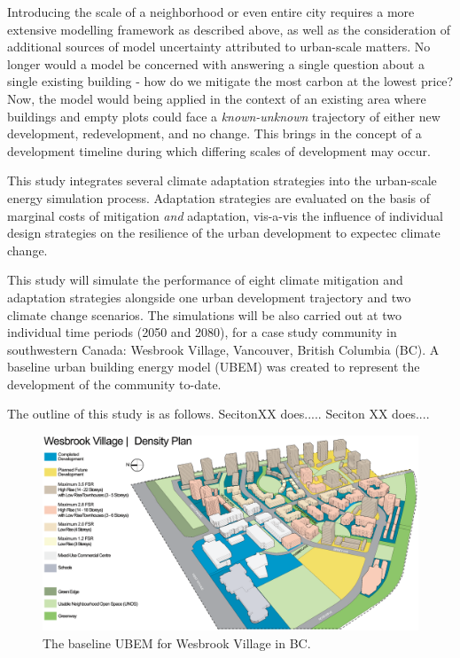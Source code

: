 \documentclass[twocolumn, a4paper,10pt]{article}
\begin{document}
Introducing the scale of a neighborhood or even entire city requires a more extensive modelling framework as described above, as well as the consideration of additional sources of model uncertainty attributed to urban-scale matters. No longer would a model be concerned with answering a single question about a single existing building - how do we mitigate the most carbon at the lowest price? Now, the model would  being applied in the context of an existing area where buildings and empty plots could face a \textit{known-unknown} trajectory of either new development, redevelopment, and no change. This brings in the concept of a development timeline during which differing scales of development may occur.

This study integrates several climate adaptation strategies into the urban-scale energy simulation process. Adaptation strategies are evaluated on the basis of marginal costs of mitigation \textit{and} adaptation, vis-a-vis the influence of individual design strategies on the resilience of the urban development to expectec climate change. 

This study will simulate the performance of eight climate mitigation and adaptation strategies alongside one urban development trajectory and two climate change scenarios. The simulations will be also carried out at two individual time periods (2050 and 2080), for a case study community in southwestern Canada: Wesbrook Village, Vancouver, British Columbia (BC). A baseline urban building energy model (UBEM) was created to represent the development of the community to-date.

The outline of this study is as follows. SecitonXX does..... Seciton XX does.... 


\begin{figure}[hbpt]
    \centering
    \includegraphics[scale=0.60]{figures/wesbrook_plan.eps}
    \caption{The baseline UBEM for Wesbrook Village in BC.}
    \label{fig:wesbrook_base}
\end{figure}
\end{document}
